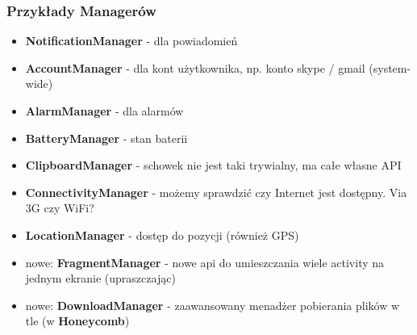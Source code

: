 \documentclass{beamer}
\begin{document}
\begin{frame}
  \frametitle{Przykłady Managerów}
      \begin{itemize}
        \item \textbf{NotificationManager} - dla powiadomień
        \item \textbf{AccountManager} - dla kont użytkownika, np. konto skype / gmail (system-wide)
        \item \textbf{AlarmManager} - dla alarmów
        \item \textbf{BatteryManager} - stan baterii
        \item \textbf{ClipboardManager} - schowek nie jest taki trywialny, ma całe własne API
        \item \textbf{ConnectivityManager} - możemy sprawdzić czy Internet jest dostępny. Via 3G czy WiFi?
        \item \textbf{LocationManager} - dostęp do pozycji (również GPS)
        \item nowe: \textbf{FragmentManager} - nowe api do umieszczania wiele activity na jednym ekranie (upraszczając)
        \item nowe: \textbf{DownloadManager} - zaawansowany menadżer pobierania plików w tle (w \textbf{Honeycomb})
      \end{itemize}
\end{frame}
\end{document}
